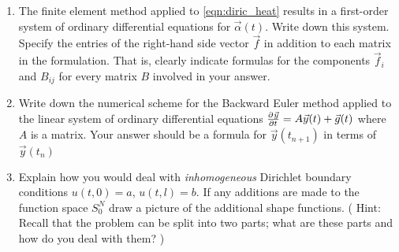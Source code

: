 \begin{enumerate}
\item The finite element method applied to \eqref{eqn:diric_heat} results in a first-order system of ordinary differential equations for $\vec{\alpha}(t)$. Write down this system.  Specify the entries of the right-hand side vector $\vec{f}$ in addition to each matrix in the formulation.  That is, clearly indicate formulas for the components $\vec{f}_i$ and $B_{ij}$ for every matrix $B$ involved in your answer. 

\item Write down the numerical scheme for the Backward Euler method applied to the linear system of ordinary differential equations $\frac{\partial^{} \vec{y}}{\partial t^{}} = A\vec{y}(t) + \vec{g}(t)$ where $A$ is a matrix.  Your answer should be a formula for $\vec{y}(t_{n+1})$ in terms of $\vec{y}(t_{n})$

\item Explain how you would deal with \textit{inhomogeneous} Dirichlet boundary conditions $u(t,0) = a$, $u(t,l) = b$.  If any additions are made to the function space $S_{0}^{N}$ draw a picture of the additional shape functions. ( Hint: Recall that the problem can be split into two parts; what are these parts and how do you deal with them? )

%
%

\end{enumerate}


